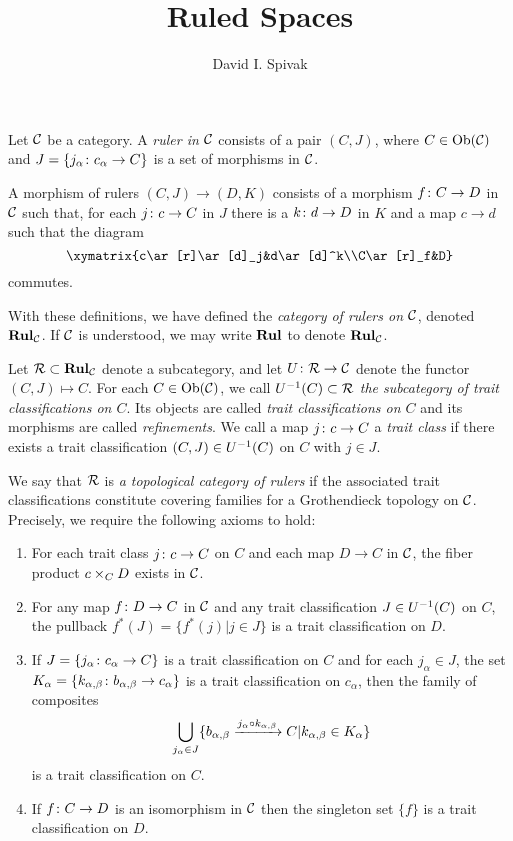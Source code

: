 \documentclass{amsart}
\def\Rul{{\bf Rul}}
\begin{document}
\title{Ruled Spaces}

\author{David I. Spivak}

\maketitle

\begin{definition}

Let $\mathcal{C}$ be a category.  A {\em ruler in $\mathcal{C}$} consists of a pair $(C,J)$, where $C\in\textnormal{Ob}(\mathcal{C})$ and $J=\{j_\alpha\colon c_\alpha\rightarrow C\}$ is a set of morphisms in $\mathcal{C}$.

A morphism of rulers $(C,J)\to(D,K)$ consists of a morphism $f\colon C\rightarrow D$ in $\mathcal{C}$ such that, for each $j\colon c\rightarrow C$ in $J$ there is a $k\colon d\rightarrow D$ in $K$ and a map $c\to d$ such that the diagram $$\xymatrix{c\ar[r]\ar[d]_j&d\ar[d]^k\\C\ar[r]_f&D}$$ commutes.

With these definitions, we have defined the {\em category of rulers on $\mathcal{C}$}, denoted $\Rul_\mcC$.  If $\mathcal{C}$ is understood, we may write $\Rul$ to denote $\Rul_\mcC$.

\end{definition}

\begin{definition}

Let $\mcR\ss\Rul_\mcC$ denote a subcategory, and let $U\colon\mathcal{R}\rightarrow\mathcal{C}$ denote the functor $(C,J)\mapsto C$.  For each $C\in\textnormal{Ob}(\mathcal{C})$, we call $U^\m1(C)\ss\mcR$ {\em the subcategory of trait classifications on $C$}.  Its objects are called {\em trait classifications on $C$} and its morphisms are called {\em refinements}.  We call a map $j\colon c\rightarrow C$ a {\em trait class} if there exists a trait classification $(C,J)\in U^\m1(C)$ on $C$ with $j\in J$.

We say that $\mathcal{R}$ is {\em a topological category of rulers} if the associated trait classifications constitute covering families for a Grothendieck topology on $\mathcal{C}$.  Precisely, we require the following axioms to hold: \begin{enumerate}\item For each trait class $j\colon c\rightarrow C$ on $C$ and each map $D\to C$ in $\mathcal{C}$, the fiber product $c\times_CD$ exists in $\mathcal{C}$. \item For any map $f\colon D\rightarrow C$ in $\mathcal{C}$ and any trait classification $J\in U^\m1(C)$ on $C$, the pullback $f^*(J)=\{f^*(j)| j\in J\}$ is a trait classification on $D$.\item If $J=\{j_\alpha\colon c_\alpha\rightarrow C\}$ is a trait classification on $C$ and for each $j_\alpha\in J$, the set $K_\alpha=\{k_{\alpha,\beta}\colon b_{\alpha,\beta}\rightarrow c_\alpha\}$ is a trait classification on $c_\alpha$, then the family of composites $$\bigcup_{j_\alpha\in J} \{b_{\alpha,\beta}\xrightarrow{j_\alpha\circ k_{\alpha,\beta}}C |k_{\alpha,\beta}\in K_\alpha\}$$ is a trait classification on $C$.\item If $f\colon C\rightarrow D$ is an isomorphism in $\mathcal{C}$ then the singleton set $\{f\}$ is a trait classification on $D$.\end{enumerate}

\end{definition}
\end{document}
